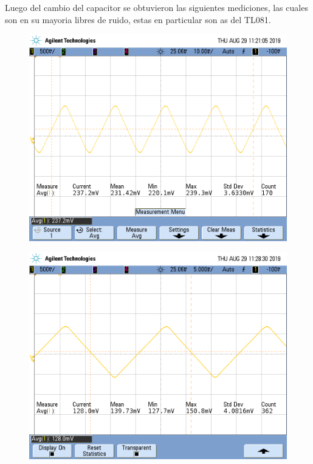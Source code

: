 Luego del cambio del capacitor  se obtuvieron las siguientes mediciones, las cuales son en su mayoria libres de ruido, estas en particular son as del TL081.

\begin{figure}[H]
\centering
\begin{minipage}{.5\textwidth}
  \centering
  \includegraphics[width=.99\linewidth]{imagenes/RS2CORTOTL081.png}
  \label{fig:ib+TLl}
\end{minipage}%
\begin{minipage}{.5\textwidth}
  \centering
  \includegraphics[width=.99\linewidth]{imagenes/RS1CORTOTL081.png}
  \label{fig:ib-TLl}
\end{minipage}
\end{figure}

